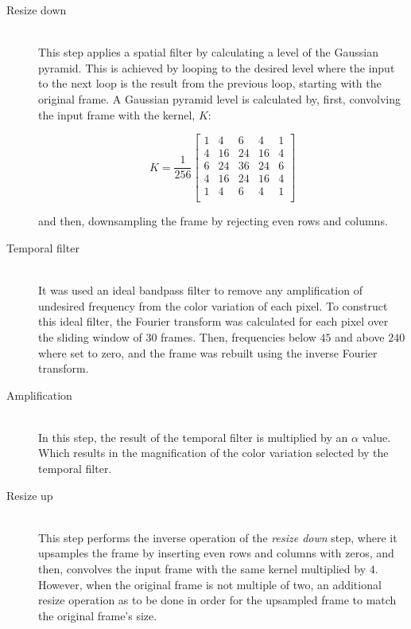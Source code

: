\begin{description}
  \item[Resize down]\hfill\\
        This step applies a spatial filter by calculating a level of the
        Gaussian pyramid. This is achieved by looping to the desired
        level where the input to the next loop is the result from the previous
        loop, starting with the original frame. A Gaussian pyramid level is
        calculated by, first, convolving the input frame with the kernel, $K$:

        \begin{equation}
          K = \frac{1}{256}
          \begin{bmatrix}
             1 &  4 &  6 &  4 &  1 \\
             4 & 16 & 24 & 16 &  4 \\
             6 & 24 & 36 & 24 &  6 \\
             4 & 16 & 24 & 16 &  4 \\
             1 &  4 &  6 &  4 &  1 \\
          \end{bmatrix}
        \end{equation}

        and then, downsampling the frame by rejecting even rows and columns.

  \item[Temporal filter]\hfill\\
        It was used an ideal bandpass filter to remove any amplification of
        undesired frequency from the color variation of each pixel.
        To construct this ideal filter, the Fourier transform was calculated
        for each pixel over the sliding window of $30$ frames. Then,
        frequencies below $45$ and above $240$ where set to zero, and the frame
        was rebuilt using the inverse Fourier transform.

  \item[Amplification]\hfill\\
        In this step, the result of the temporal filter is multiplied by an
        $\alpha$ value. Which results in the magnification of the color
        variation selected by the temporal filter.

  \item[Resize up]\hfill\\
        This step performs the inverse operation of the \emph{resize down} step,
        where it upsamples the frame by inserting even rows and columns with
        zeros, and then, convolves the input frame with the same kernel
        multiplied by $4$. However, when the original frame is not multiple of
        two, an additional resize operation as to be done in order for the
        upsampled frame to match the original frame's size.
\end{description}

